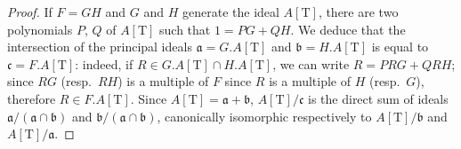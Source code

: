\begin{proof}
If $F=GH$ and $G$ and $H$ generate the ideal $A[\mathrm{T}]$, there are two polynomials $P$, $Q$ of $A[\mathrm{T}]$ such that $1=PG+QH$.
We deduce that the intersection of the principal ideals $\mathfrak{a}=G.A[\mathrm{T}]$ and $\mathfrak{b}=H.A[\mathrm{T}]$ is equal to $\mathfrak{c}=F.A[\mathrm{T}]$:
indeed, if $R\in G.A[\mathrm{T}]\cap H.A[\mathrm{T}]$, we can write $R=PRG+QRH$;
since $RG$ (resp.\ $RH$) is a multiple of $F$ since $R$ is a multiple of $H$ (resp.\ $G$), therefore $R\in F.A[\mathrm{T}]$.
Since $A[\mathrm{T}]=\mathfrak{a}+\mathfrak{b}$, $A[\mathrm{T}]/\mathfrak{c}$ is the direct sum of ideals $\mathfrak{a}/(\mathfrak{a}\cap\mathfrak{b})$ and $\mathfrak{b}/(\mathfrak{a}\cap\mathfrak{b})$, canonically isomorphic respectively to $A[\mathrm{T}]/\mathfrak{b}$ and $A[\mathrm{T}]/\mathfrak{a}$.


\end{proof}
